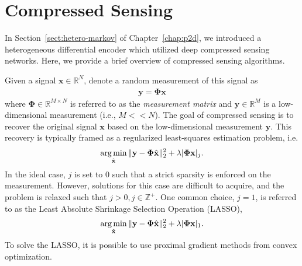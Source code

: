 \chapter{Compressed Sensing}
\label{appdx:compressed-sensing}

In Section~\ref{sect:hetero-markov} of Chapter~\ref{chap:p2d}, we introduced a heterogeneous differential encoder which utilized deep compressed sensing networks. Here, we provide a brief overview of compressed sensing algorithms.

Given a signal $\mathbf{x}\in\mathbb{R}^N$, denote a random measurement of this signal as 
\begin{align*}
    \mathbf{y} = \mathbf{\Phi}\mathbf{x}
\end{align*}
where $\mathbf{\Phi}\in\mathbb{R}^{M\times N}$ is referred to as the \emph{measurement matrix} and $\mathbf{y}\in\mathbb{R}^{M}$ is a low-dimensional measurement (i.e., $M << N$). The goal of compressed sensing is to recover the original signal $\mathbf{x}$ based on the low-dimensional measurement $\mathbf{y}$. This recovery is typically framed as a regularized least-squares estimation problem, i.e.
\begin{align*}
    \operatorname*{arg\,min}_{\hat{\mathbf{x}}} \|\mathbf{y}-\mathbf{\Phi}\hat{\mathbf{x}}\|_2^2 + \lambda|\mathbf{\Phi}\mathbf{x}|_j.
\end{align*}
In the ideal case, $j$ is set to 0 such that a strict sparsity is enforced on the measurement. However, solutions for this case are difficult to acquire, and the problem is relaxed such that $j > 0, j\in\mathbb{Z}^{+}$. One common choice, $j=1$, is referred to as the Least Absolute Shrinkage Selection Operation (LASSO),
\begin{align*}
    \operatorname*{arg\,min}_{\hat{\mathbf{x}}} \|\mathbf{y}-\mathbf{\Phi}\hat{\mathbf{x}}\|_2^2 + \lambda|\mathbf{\Phi}\mathbf{x}|_1.
\end{align*}
To solve the LASSO, it is possible to use proximal gradient methods from convex optimization. %

